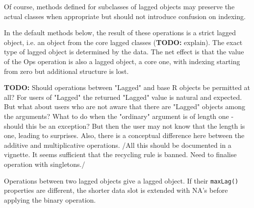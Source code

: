 \documentclass[11pt,a4paper]{article}
\begin{document}
Of course, methods defined for subclasses of lagged objects may preserve the actual classes
when appropriate but should not introduce confusion on indexing.

In the default methods below, the result of these operations is a strict lagged object,
i.e. an object from the core lagged classes (\textbf{TODO:} explain). The exact type of lagged
object is determined by the data. The net effect is that the value of the Ops operation is
also a lagged object, a core one, with indexing starting from zero but additional structure
is lost.


\textbf{TODO:} Should operations between "Lagged" and base R objects be permitted at all?  For users
of "Lagged" the returned "Lagged" value is natural and expected. But what about users who are
not aware that there are "Lagged" objects among the arguments? What to do when the "ordinary"
argument is of length one - should this be an exception? But then the user may not know that
the length is one, leading to surprises. Also, there is a conceptual difference here between
the additive and multiplicative operations. /All this should be documented in a vignette. It
seems sufficient that the recycling rule is banned. Need to finalise operation with
singletons./


Operations between two lagged objects give a lagged object. If their \texttt{maxLag()} properties
are different, the shorter data slot is extended with NA's before applying the binary
operation.
\end{document}
